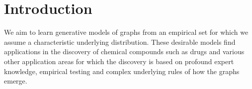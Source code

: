 \documentclass{article}
\title{\articleTitle}
\author{
	Julian Stier, Michael Granitzer\\
	University of Passau\\
	Innstraße 41, 94032 Passau, Germany\\
	\texttt{\articleEmail}
	\ifthenelse{\boolean{vc_is_included}}{\tiny\protect\\\VCDateTEX~$\sim$~\GITAbrHash}{~}
}
\begin{document}
\maketitle

\begin{abstract}
	Learning distributions of graphs can be used for automatic drug discovery, molecular design, complex network analysis, and much more.
We present an improved framework for learning generative models of graphs based on the idea of deep state machines.
To learn state transition decisions we use a set of graph and node embedding techniques as memory of the state machine.

Our analysis is based on learning the distribution of random graph generators for which we provide statistical tests to determine which properties can be learned and how well the original distribution of graphs is represented.
We show that the design of the state machine favors specific distributions.
Models of graphs of size up to 150 vertices are learned.
Code and parameters are publicly available to reproduce our results.

 \end{abstract}

\maketitle

\section{Introduction}\label{sec:introduction}
We aim to learn generative models of graphs from an empirical set for which we assume a characteristic underlying distribution.
These desirable models find applications in the discovery of chemical compounds such as drugs and various other application areas for which the discovery is based on profound expert knowledge, empirical testing and complex underlying rules of how the graphs emerge.
\end{document}
